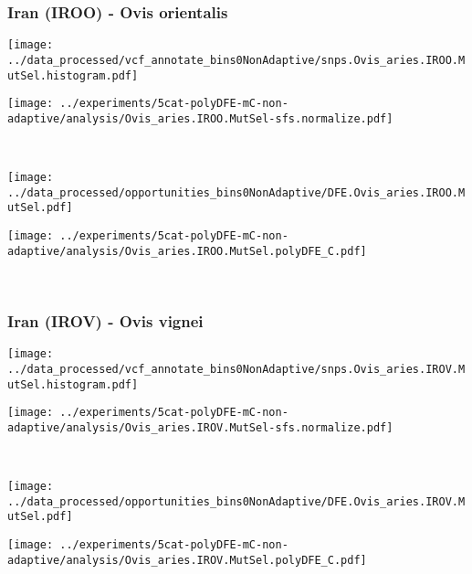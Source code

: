 \subsubsection{Iran (IROO) - Ovis orientalis}

\begin{minipage}{0.49\linewidth}
    \texttt{[image: ../data\_processed/vcf\_annotate\_bins0NonAdaptive/snps.Ovis\_aries.IROO.MutSel.histogram.pdf]}
\end{minipage}
\begin{minipage}{0.49\linewidth}
    \texttt{[image: ../experiments/5cat-polyDFE-mC-non-adaptive/analysis/Ovis\_aries.IROO.MutSel-sfs.normalize.pdf]}
\end{minipage}
\\
\begin{minipage}{0.49\linewidth}
    \texttt{[image: ../data\_processed/opportunities\_bins0NonAdaptive/DFE.Ovis\_aries.IROO.MutSel.pdf]}
\end{minipage}
\begin{minipage}{0.49\linewidth}
    \texttt{[image: ../experiments/5cat-polyDFE-mC-non-adaptive/analysis/Ovis\_aries.IROO.MutSel.polyDFE\_C.pdf]}
\end{minipage}
\\

\subsubsection{Iran (IROV) - Ovis vignei}

\begin{minipage}{0.49\linewidth}
    \texttt{[image: ../data\_processed/vcf\_annotate\_bins0NonAdaptive/snps.Ovis\_aries.IROV.MutSel.histogram.pdf]}
\end{minipage}
\begin{minipage}{0.49\linewidth}
    \texttt{[image: ../experiments/5cat-polyDFE-mC-non-adaptive/analysis/Ovis\_aries.IROV.MutSel-sfs.normalize.pdf]}
\end{minipage}
\\
\begin{minipage}{0.49\linewidth}
    \texttt{[image: ../data\_processed/opportunities\_bins0NonAdaptive/DFE.Ovis\_aries.IROV.MutSel.pdf]}
\end{minipage}
\begin{minipage}{0.49\linewidth}
    \texttt{[image: ../experiments/5cat-polyDFE-mC-non-adaptive/analysis/Ovis\_aries.IROV.MutSel.polyDFE\_C.pdf]}
\end{minipage}
\\

